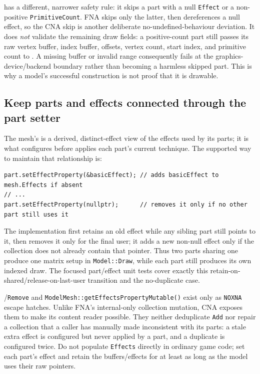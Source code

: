  has a different, narrower safety rule: it skips a part with a null
\texttt{Effect} or a non-positive \texttt{PrimitiveCount}. FNA skips only the latter, then
dereferences a null effect, so the CNA skip is another deliberate no-undefined-behaviour
deviation. It does \emph{not} validate the remaining draw fields: a positive-count part still
passes its raw vertex buffer, index buffer, offsets, vertex count, start index, and primitive
count to . A missing buffer or invalid range consequently fails at the
graphics-device/backend boundary rather than becoming a harmless skipped part. This is why a
model's successful construction is not proof that it is drawable.

\subsection{Keep parts and effects connected through the part setter}

The mesh's  is a derived, distinct-effect view of the effects
used by its parts; it is what  configures before
 applies each part's current technique. The supported way to maintain
that relationship is:

\begin{lstlisting}
part.setEffectProperty(&basicEffect); // adds basicEffect to mesh.Effects if absent
// ...
part.setEffectProperty(nullptr);      // removes it only if no other part still uses it
\end{lstlisting}

The implementation first retains an old effect while any sibling part still points to it, then
removes it only for the final user; it adds a new non-null effect only if the collection does not
already contain that pointer. Thus two parts sharing one  produce one
matrix setup in \texttt{Model::Draw}, while each part still produces its own indexed draw. The
focused part/effect unit tests cover exactly this retain-on-shared/release-on-last-user transition
and the no-duplicate case.

/\texttt{Remove} and
\texttt{ModelMesh::getEffectsPropertyMutable()} exist only as \texttt{NOXNA} escape hatches.
Unlike FNA's internal-only collection mutation, CNA exposes them to make its content reader
possible. They neither deduplicate \texttt{Add} nor repair a collection that a caller has
manually made inconsistent with its parts: a stale extra effect is configured but never applied
by a part, and a duplicate is configured twice. Do not populate \texttt{Effects} directly in
ordinary game code; set each part's effect and retain the buffers/effects for at least as long as
the model uses their raw pointers.

